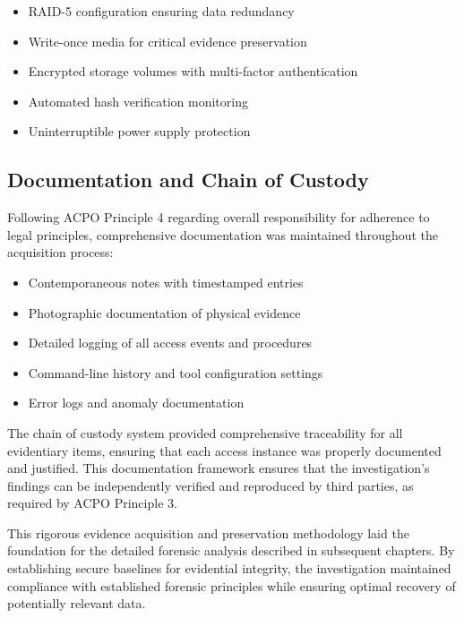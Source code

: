 \begin{itemize}
    \item RAID-5 configuration ensuring data redundancy
    \item Write-once media for critical evidence preservation
    \item Encrypted storage volumes with multi-factor authentication
    \item Automated hash verification monitoring
    \item Uninterruptible power supply protection
\end{itemize}

\subsection{Documentation and Chain of Custody}
Following ACPO Principle 4 regarding overall responsibility for adherence to legal principles, comprehensive documentation was maintained throughout the acquisition process:

\begin{itemize}
    \item Contemporaneous notes with timestamped entries
    \item Photographic documentation of physical evidence
    \item Detailed logging of all access events and procedures
    \item Command-line history and tool configuration settings
    \item Error logs and anomaly documentation
\end{itemize}

The chain of custody system provided comprehensive traceability for all evidentiary items, ensuring that each access instance was properly documented and justified. This documentation framework ensures that the investigation's findings can be independently verified and reproduced by third parties, as required by ACPO Principle 3.

This rigorous evidence acquisition and preservation methodology laid the foundation for the detailed forensic analysis described in subsequent chapters. By establishing secure baselines for evidential integrity, the investigation maintained compliance with established forensic principles while ensuring optimal recovery of potentially relevant data.